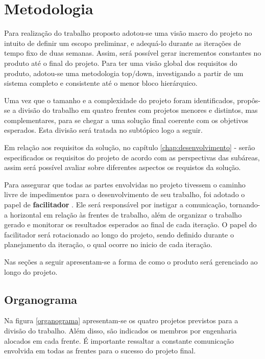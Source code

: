 \chapter{Metodologia}
\label{chap:metodologia}
	
	Para realização do trabalho proposto adotou-se uma visão macro do projeto no intuito de definir um escopo preliminar, e adequá-lo durante as iterações de tempo fixo de duas semanas. Assim, será possível gerar incrementos constantes no produto até o final do projeto. Para ter uma visão global dos requisitos do produto, adotou-se uma metodologia top/down, investigando a partir de um sistema completo e consistente até o menor bloco hierárquico.

	Uma vez que o tamanho e a complexidade do projeto foram identificados, propôs-se a divisão do trabalho em quatro frentes com projetos menores e distintos, mas complementares, para se chegar a uma solução final coerente com os objetivos esperados. Esta divisão será tratada no subtópico logo a seguir.

	Em relação aos requisitos da solução, no capítulo \ref{chap:desenvolvimento} -  serão especificados os requisitos do projeto de acordo com as perspectivas das subáreas, assim será possível avaliar sobre diferentes aspectos os requistos da solução.

	Para assegurar que todas as partes envolvidas no projeto tivessem o caminho livre de impedimentos para o desenvolvimento de seu trabalho, foi adotado o papel de \textbf{facilitador} \cite{Facilitador}. Ele será responsável por instigar a comunicação, tornando-a horizontal em relação às frentes de trabalho, além de organizar o trabalho gerado e monitorar os resultados esperados ao final de cada iteração. O papel do facilitador será rotacionado ao longo do projeto, sendo definido durante o planejamento da iteração, o qual ocorre no inicio de cada iteração.

	Nas seções a seguir apresentam-se a forma de como o produto será gerenciado ao longo do projeto.


	\section{Organograma}

		Na figura \ref{organograma} apresentam-se os quatro projetos previstos para a divisão do trabalho. Além disso, são indicados os membros por engenharia alocados em cada frente. É importante ressaltar a constante comunicação envolvida em todas as frentes para o sucesso do projeto final.

